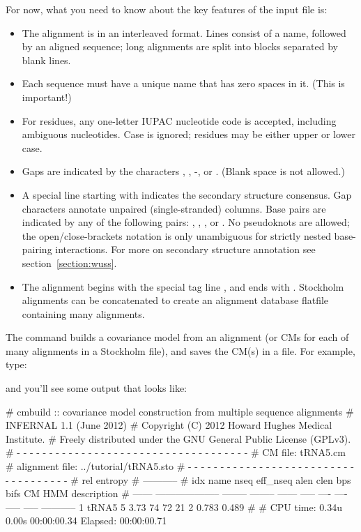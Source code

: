 For now, what you need to know about the key features of the input file is:
\begin{itemize}
\item The alignment is in an interleaved format.
Lines consist of a name, followed by an aligned sequence;
long alignments are split into blocks separated by blank lines.
\item Each sequence must have a unique name that has zero spaces in it. (This is important!)
\item For residues, any one-letter IUPAC nucleotide code is accepted,
      including ambiguous nucleotides. Case is ignored; residues
      may be either upper or lower case.
\item Gaps are indicated by the characters , \otext{_}, -, or \otext{~}.
      (Blank space is not allowed.)
\item A special line starting with  indicates
      the secondary structure consensus. Gap characters annotate
      unpaired (single-stranded) columns. Base pairs are indicated
      by any of the following pairs: \otext{<>}, \otext{()}, \otext{[]},
      or \otext{[]}. No pseudoknots are allowed; the
      open/close-brackets notation is only unambiguous for strictly
      nested base-pairing interactions.
      For more on secondary structure annotation see
      section~\ref{section:wuss}.
\item The alignment begins with the special tag line
      , and ends with \otext{//}.
      Stockholm alignments
      can be concatenated to create an alignment database flatfile
      containing many alignments.
\end{itemize}

The  command builds a covariance model from an alignment (or
CMs for each of many alignments in a Stockholm file), and saves the
CM(s) in a file. For example, type:


and you'll see some output that looks like:

\begin{sreoutput}
# cmbuild :: covariance model construction from multiple sequence alignments
# INFERNAL 1.1 (June 2012)
# Copyright (C) 2012 Howard Hughes Medical Institute.
# Freely distributed under the GNU General Public License (GPLv3).
# - - - - - - - - - - - - - - - - - - - - - - - - - - - - - - - - - - - -
# CM file:                                            tRNA5.cm
# alignment file:                                     ../tutorial/tRNA5.sto
# - - - - - - - - - - - - - - - - - - - - - - - - - - - - - - - - - - - -
#                                                                      rel entropy
#                                                                      -----------
# idx    name                     nseq eff_nseq   alen  clen  bps bifs    CM   HMM description
# ------ -------------------- -------- -------- ------ ----- ---- ---- ----- ----- -----------
       1 tRNA5                       5     3.73     74    72   21    2 0.783 0.489 
#
# CPU time: 0.34u 0.00s 00:00:00.34 Elapsed: 00:00:00.71
\end{sreoutput}

